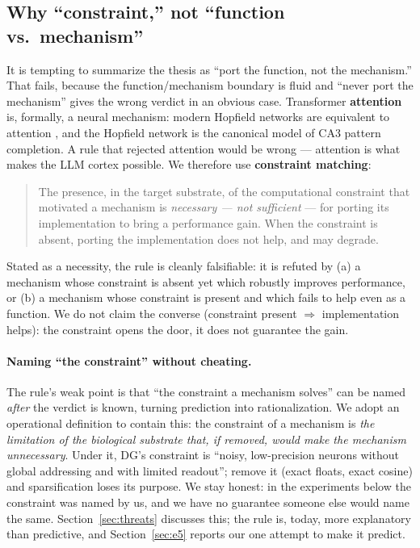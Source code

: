 \documentclass[11pt]{article}
\begin{document}
\subsection{Why ``constraint,'' not ``function vs.\ mechanism''}
It is tempting to summarize the thesis as ``port the function, not the mechanism.'' That fails, because the function/mechanism boundary is fluid and ``never port the mechanism'' gives the wrong verdict in an obvious case. Transformer \textbf{attention} is, formally, a neural mechanism: modern Hopfield networks are equivalent to attention \citep{ramsauer2020}, and the Hopfield network is the canonical model of CA3 pattern completion. A rule that rejected attention would be wrong --- attention is what makes the LLM cortex possible. We therefore use \textbf{constraint matching}:
\begin{quote}
The presence, in the target substrate, of the computational constraint that motivated a mechanism is \emph{necessary --- not sufficient} --- for porting its implementation to bring a performance gain. When the constraint is absent, porting the implementation does not help, and may degrade.
\end{quote}
Stated as a necessity, the rule is cleanly falsifiable: it is refuted by (a) a mechanism whose constraint is absent yet which robustly improves performance, or (b) a mechanism whose constraint is present and which fails to help even as a function. We do not claim the converse (constraint present $\Rightarrow$ implementation helps): the constraint opens the door, it does not guarantee the gain.

\paragraph{Naming ``the constraint'' without cheating.} The rule's weak point is that ``the constraint a mechanism solves'' can be named \emph{after} the verdict is known, turning prediction into rationalization. We adopt an operational definition to contain this: the constraint of a mechanism is \emph{the limitation of the biological substrate that, if removed, would make the mechanism unnecessary}. Under it, DG's constraint is ``noisy, low-precision neurons without global addressing and with limited readout''; remove it (exact floats, exact cosine) and sparsification loses its purpose. We stay honest: in the experiments below the constraint was named by us, and we have no guarantee someone else would name the same. Section~\ref{sec:threats} discusses this; the rule is, today, more explanatory than predictive, and Section~\ref{sec:e5} reports our one attempt to make it predict.
\end{document}

